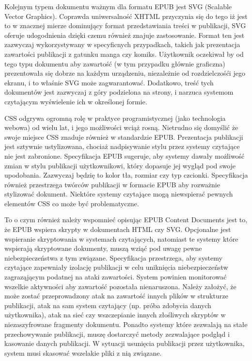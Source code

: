 Kolejnym typem dokumentu ważnym dla formatu EPUB jest SVG (Scalable Vector Graphics). Coprawda uniwersalność XHTML przyczynia się do tego iż jest to w znacznej mierze dominujący format przedstawiania treści w publikacji, SVG oferuje udogodnienia dzięki czemu również znajuje zastosowanie. Format ten jest zazwyczaj wykorzystywany w specyficnych przypadkach, takich jak prezentacja zawartości publikacji z gatunku manga czy komiks. Użytkownik oczekiwał by od tego typu dokumentu aby zawartość (w tym przypadku głównie graficzna) prezentowała się dobrze na każdym urządzeniu, niezależnie od rozdzielczośći jego ekranu, i to właśnie SVG może zagwarantować. Dodatkowo, treść tych dokumentów jest zazwyczaj z góry podzielona na strony, i narzuca systemom czytającym wyświelenie ich w określonej formie.

CSS odgrywa ogromną rolę w praktyce programistycznej (jako technologia webowa) od wielu lat, i jego możliwości wciąż rosną. Nietrudno się domyślić że swoje miejsce CSS znaduje również w standardzie EPUB. Prezentacja publikacji jest sztywnie ustylizowana, chociaż nadpisywanie stylu przez systemy czytające nie jest zabronione. Specyfikacja EPUB sugeruje, aby systemy dawały możliwość zmian w stylu publikacji użytkownikowi, który dopasuje jej wygląd pod swoje upodobania. Zazwyczaj będzię to kolor tła, rozmiar czy typ czcionki. Specyfikacja również przestrzega twórców publikacji w formacie EPUB aby rozważnie stylizować dokument. Niektóre systemy czytające mogą niewspierać pewnych elementów CSS co może być problematyczne\cite{EPUBContentDocumentsSpecificationCSS}.

To o czym również należy wspomnieć opisując EPUB Content Documents jest to, że EPUB wspiera skrypty w dokumentach HTML czy SVG. Opcjonalne jest wspieranie skryptowania w systemach czytających, natomiast te systemy które wspierają skryptowane dokumenty, muszą wziąć pod uwagę pewne niebezpieczeństwa z tym związane. Specyfikacja przestrzega, aby systemy czytające zapewniały izolację publikacji w celu uniknięcia niebezpieczeństw zagraząjącym podatnej na ataki zawartości. System powinien monitorować wszelkie aktywności aby zawartość pozostała nienaruszona. Należy założyć, że może zostać przeprowadzony atak na zawartość innych plików w strukturze publikacji, atak na sam system czytający (np. próba zdobycia danych użytkownika), atak na sieć czy wszczepianie innych złośliwych skryptów w niezaszyfrowane fragmenty dokumentu. Ponadto systemy które zezwalają na stałe przechowywanie publikacji, muszę dostarczyć metody zezwalające podgląd i kasowanie danych publikacji. W sytuacji usunięcia publikacji przez użytkownika, system musi skasować wszelakie pliki z nią związane\cite{EPUBContentDocumentsSpecificationJS}.

